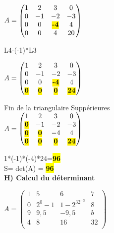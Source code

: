 \vspace{5mm} %

$
A =
\begin{pmatrix}
  1 & 2 & 3 & 0    \\
  0 & -1 & -2 & -3 \\
  0 & 0 & \hl{\textbf{-4}} & 4   \\
  0 & 0 & 4 & 20  \\
\end{pmatrix}
$

\vspace{5mm} %

L4-(-1)*L3 \\

\vspace{2mm} %

$
A =
\begin{pmatrix}
  1 & 2 & 3 & 0    \\
  0 & -1 & -2 & -3 \\
  0 & 0 & \hl{\textbf{-4}} & 4   \\
  \hl{\textbf{0}} & \hl{\textbf{0}} & \hl{\textbf{0}} & \hl{\textbf{24}}  \\
\end{pmatrix}
$

\vspace{8mm} %
Fin de la triangulaire Suppérieures \\

$
A =
\begin{pmatrix}
  1 & 2 & 3 & 0    \\
  \hl{\textbf{0}} & -1 & -2 & -3 \\
  \hl{\textbf{0}} & \hl{\textbf{0}} & -4 & 4   \\
  \hl{\textbf{0}} & \hl{\textbf{0}} & \hl{\textbf{0}} & \hl{\textbf{24}}  \\
\end{pmatrix}
$

\vspace{8mm} %

1*(-1)*(-4)*24=\hl{\textbf{96}} \\

S= det(A) = \hl{\textbf{96}} \\

\newpage
\textbf{H) Calcul du déterminant}
\vspace{5mm} %

$
A =
\begin{pmatrix}
  1 & 5 & 6 & 7 \\
  0 & 2^0-1 & 1-2^32^{-3} & 8 \\
  9 & 9,5 & -9,5 & b \\
  4 & 8 & 16 & 32 \\
\end{pmatrix}
$

